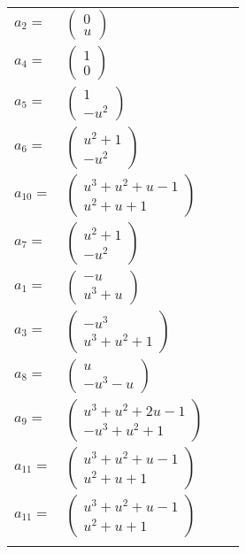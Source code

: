 \documentclass[1p]{elsarticle_modified}
\theoremstyle{definition}
\begin{document}
\begin{tabular}{m{7pt} m{180pt} m{7pt} m{180pt} }
\flushright $a_{2}=$&$\begin{pmatrix}0\\u\end{pmatrix}$ \\
\flushright $a_{4}=$&$\begin{pmatrix}1\\0\end{pmatrix}$ \\
\flushright $a_{5}=$&$\begin{pmatrix}1\\- u^2\end{pmatrix}$ \\
\flushright $a_{6}=$&$\begin{pmatrix}u^2+1\\- u^2\end{pmatrix}$ \\
\flushright $a_{10}=$&$\begin{pmatrix}u^3+u^2+u-1\\u^2+u+1\end{pmatrix}$ \\
\flushright $a_{7}=$&$\begin{pmatrix}u^2+1\\- u^2\end{pmatrix}$ \\
\flushright $a_{1}=$&$\begin{pmatrix}- u\\u^3+u\end{pmatrix}$ \\
\flushright $a_{3}=$&$\begin{pmatrix}- u^3\\u^3+u^2+1\end{pmatrix}$ \\
\flushright $a_{8}=$&$\begin{pmatrix}u\\- u^3- u\end{pmatrix}$ \\
\flushright $a_{9}=$&$\begin{pmatrix}u^3+u^2+2 u-1\\- u^3+u^2+1\end{pmatrix}$ \\
\flushright $a_{11}=$&$\begin{pmatrix}u^3+u^2+u-1\\u^2+u+1\end{pmatrix}$\\ \flushright $a_{11}=$&$\begin{pmatrix}u^3+u^2+u-1\\u^2+u+1\end{pmatrix}$\\&\end{tabular}
\end{document}

